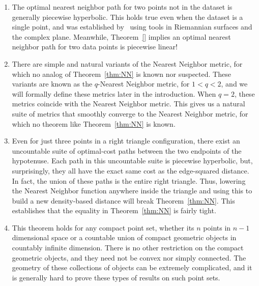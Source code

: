 \begin{enumerate}

\item The optimal nearest neighbor path for two points not in the dataset
is generally piecewise hyperbolic. This holds true even when the
dataset is a single point, and was established by~\cite{}
using tools in Riemannian surfaces and the complex plane.
Meanwhile, Theorem~\ref{} implies an optimal nearest
neighbor path for two data points is piecewise linear!

\item There are simple and natural variants of the Nearest Neighbor metric,
for which no analog of Theorem~\ref{thm:NN} is known nor suspected.
These variants are known as the $q$-Nearest Neighbor
metric, for $1 < q < 2$, and we will formally define these
metrics later in the introduction. When $q=2$, these
metrics coincide with the Nearest Neighbor metric.
This
gives us a natural suite of metrics that smoothly converge
to the Nearest Neighbor metric, for which no theorem like
Theorem~\ref{thm:NN} is known.

\item Even for just three points in a right triangle configuration, there
exist an uncountable suite of optimal-cost paths between the two
endpoints of the hypotenuse. Each path in this uncountable
suite is piecewise hyperbolic, but, surprisingly, they all
have the exact same cost as the edge-squared distance. In
fact, the union of these paths is the entire right
triangle. Thus, lowering the Nearest Neighbor function
anywhere inside the triangle and using this to build a new
density-based distance will break
Theorem~\ref{thm:NN}. This establishes that the equality in
Theorem~\ref{thm:NN} is fairly tight.

\item This theorem holds for any compact point set, whether its $n$ points
in $n-1$ dimensional space or a countable union of compact geometric
objects in countably infinite dimension. There is no other restriction on
the compact geometric objects, and they need not be convex nor simply
connected. The geometry of these collections of objects can be
extremely complicated, and it is generally hard to prove
these types of results on such point sets.


\end{enumerate}
